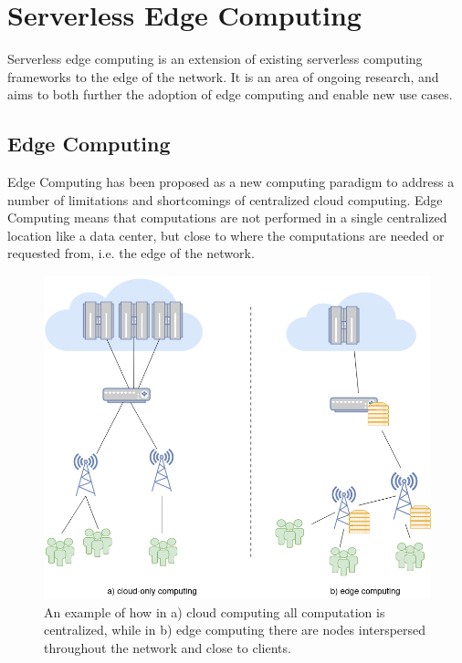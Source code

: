 \section{Serverless Edge Computing}

Serverless edge computing is an extension of existing serverless computing frameworks to the edge of the network.
It is an area of ongoing research, and aims to both further the adoption of edge computing and enable new use cases\cite{nasticServerlessRealTimeData2017}.

\subsection{Edge Computing}
Edge Computing has been proposed as a new computing paradigm to address a number of limitations and shortcomings of centralized cloud computing.
Edge Computing means that computations are not performed in a single centralized location like a data center, but close to where the computations are needed or requested from, i.e. the edge of the network\cite{shiPromiseEdgeComputing2016}.

\begin{figure}
    \centering
    \includegraphics[width=12cm]{graphics/diagrams/edge_computing_example.png}
    \caption{An example of how in a) cloud computing all computation is centralized, while in b) edge computing there are nodes interspersed throughout the network and close to clients.}
    \label{fig:edge_comp_example}
\end{figure}

